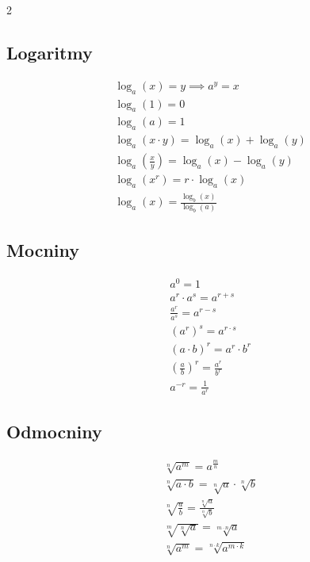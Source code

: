 \documentclass[12pt,a4paper]{article}
\begin{document}
\begin{multicols}{2}
\subsection*{Logaritmy}
\begin{align*}
&\log_a(x) = y \implies a^y = x \\
&\log_a(1) = 0 \\
&\log_a(a) = 1 \\
&\log_a(x \cdot y) = \log_a(x) + \log_a(y) \\
&\log_a\left(\frac{x}{y}\right) = \log_a(x) - \log_a(y) \\
&\log_a(x^r) = r \cdot \log_a(x) \\
&\log_a(x) = \frac{\log_b(x)}{\log_b(a)}
\end{align*}

\subsection*{Mocniny}
\begin{align*}
&a^0 = 1 \\
&a^r \cdot a^s = a^{r+s} \\
&\frac{a^r}{a^s} = a^{r-s} \\
&(a^r)^s = a^{r \cdot s} \\
&(a \cdot b)^r = a^r \cdot b^r \\
&\left(\frac{a}{b}\right)^r = \frac{a^r}{b^r} \\
&a^{-r} = \frac{1}{a^r}
\end{align*}

\subsection*{Odmocniny}
\begin{align*}
&\sqrt[n]{a^m} = a^{\frac{m}{n}} \\
&\sqrt[n]{a \cdot b} = \sqrt[n]{a} \cdot \sqrt[n]{b} \\
&\sqrt[n]{\frac{a}{b}} = \frac{\sqrt[n]{a}}{\sqrt[n]{b}} \\
&\sqrt[m]{\sqrt[n]{a}} = \sqrt[m \cdot n]{a} \\
&\sqrt[n]{a^m} = \sqrt[n \cdot k]{a^{m \cdot k}}
\end{align*}

\end{multicols}
\end{document}
